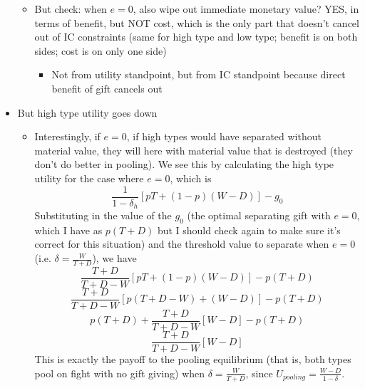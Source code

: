 \documentclass[12pt]{article}
\newcommand{\de}{\delta}
\begin{document}
\begin{itemize}
		\begin{itemize}
			\item But check: when $e=0$, also wipe out immediate monetary value? YES, in terms of benefit, but NOT cost, which is the only part that doesn't cancel out of IC constraints (same for high type and low type; benefit is on both sides; cost is on only one side)
				\begin{itemize}
					\item Not from utility standpoint, but from IC standpoint because direct benefit of gift cancels out
				\end{itemize}
		\end{itemize}
	\item But high type utility goes down
		\begin{itemize}
			\item Interestingly, if $e=0$, if high types would have separated without material value, they will here with material value that is destroyed (they don't do better in pooling). We see this by calculating the high type utility for the case where $e=0$, which is
				\[
				  \frac{1}{1-\de_h}\left[pT + (1-p)(W-D) \right] - g_0
				\]
				Substituting in the value of the $g_0$ (the optimal separating gift with $e=0$, which I have as $p(T+D)$ but I should check again to make sure it's correct for this situation) and the threshold value to separate when $e=0$ (i.e. $\de = \frac{W}{T+D}$), we have
				\[
				  \frac{T+D}{T+D-W}\left[pT + (1-p)(W-D) \right] - p(T+D)
				\]
				\[
				  \frac{T+D}{T+D-W}\left[p(T +D -W) + (W-D) \right] - p(T+D)
				\]
				\[
				  p(T+D) + \frac{T+D}{T+D-W}\left[W-D \right] - p(T+D)
				\]
				\[
				  \frac{T+D}{T+D-W}\left[W-D \right]
				\]
				This is exactly the payoff to the pooling equilibrium (that is, both types pool on fight with no gift giving) when $\de = \frac{W}{T+D}$, since $U_{pooling} = \frac{W-D}{1-\de}$.
				

\end{itemize}
\end{itemize}
\end{document}
